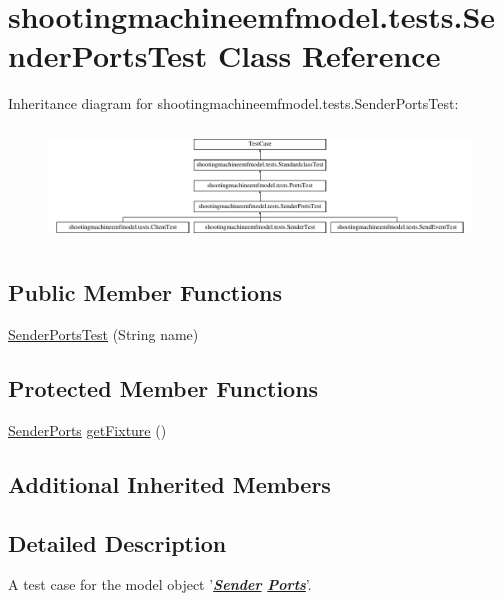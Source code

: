 \hypertarget{classshootingmachineemfmodel_1_1tests_1_1_sender_ports_test}{\section{shootingmachineemfmodel.\-tests.\-Sender\-Ports\-Test Class Reference}
\label{classshootingmachineemfmodel_1_1tests_1_1_sender_ports_test}
}
Inheritance diagram for shootingmachineemfmodel.\-tests.\-Sender\-Ports\-Test\-:\begin{figure}[H]
\begin{center}
\leavevmode
\includegraphics[height=3.080308cm]{classshootingmachineemfmodel_1_1tests_1_1_sender_ports_test}
\end{center}
\end{figure}
\subsection*{Public Member Functions}
\begin{DoxyCompactItemize}
\item 
\hyperlink{classshootingmachineemfmodel_1_1tests_1_1_sender_ports_test_a508ec5b89c2e5723b43965c47a980f1d}{Sender\-Ports\-Test} (String name)
\end{DoxyCompactItemize}
\subsection*{Protected Member Functions}
\begin{DoxyCompactItemize}
\item 
\hyperlink{interfaceshootingmachineemfmodel_1_1_sender_ports}{Sender\-Ports} \hyperlink{classshootingmachineemfmodel_1_1tests_1_1_sender_ports_test_a80addcde017d68a0a7642fb0c1c1ce9b}{get\-Fixture} ()
\end{DoxyCompactItemize}
\subsection*{Additional Inherited Members}


\subsection{Detailed Description}
A test case for the model object '{\itshape {\bfseries \hyperlink{interfaceshootingmachineemfmodel_1_1_sender}{Sender} \hyperlink{interfaceshootingmachineemfmodel_1_1_ports}{Ports}}}'.

